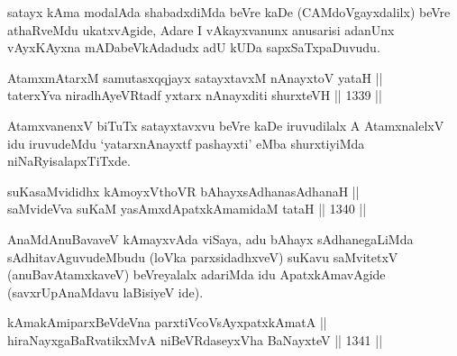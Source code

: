 \begin{artha}
satayx kAma modalAda shabadxdiMda beVre kaDe (CAMdoVgayxdalilx) beVre athaRveMdu ukatxvAgide, Adare I vAkayxvanunx anusarisi adanUnx vAyxKAyxna mADabeVkAdadudx adU kUDa sapxSaTxpaDuvudu.
\end{artha}


\begin{shl}
AtamxmAtarxM samutasxqqjayx satayxtavxM nAnayxtoV yataH || \\
taterxYva niradhAyeVRtadf \footnotemark[2]yxtarx nAnayxditi shurxteVH \hfill || 1339 ||  
\end{shl}

\begin{artha}
AtamxvanenxV biTuTx satayxtavxvu beVre kaDe iruvudilalx A AtamxnalelxV idu iruvudeMdu `yatarxnAnayxtf pashayxti' eMba shurxtiyiMda niNaRyisalapxTiTxde.
\end{artha}


\begin{shl}
suKasaMvididhx kAmoyxV\s thoVR bAhayxsAdhanasAdhanaH || \\
saMvideVva suKaM yasAmxdApatxkAmamidaM tataH \hfill || 1340 ||  
\end{shl}

\begin{artha}
AnaMdAnuBavaveV kAmayxvAda viSaya, adu bAhayx sAdhanegaLiMda sAdhitavAguvudeMbudu (loVka parxsidadhxveV) suKavu saMvitetxV (anuBavAtamxkaveV) beVreyalalx adariMda idu ApatxkAmavAgide (savxrUpAnaMdavu laBisiyeV ide).
\end{artha}


\begin{shl}
kAmakAmiparxBeVdeVna parxtiVcoV\s sAyx\s \s patxkAmatA || \\
hiraNayxgaBaRvatikxMvA niBeVRdaseyxVha BaNayxteV \hfill || 1341 ||  
\end{shl}

